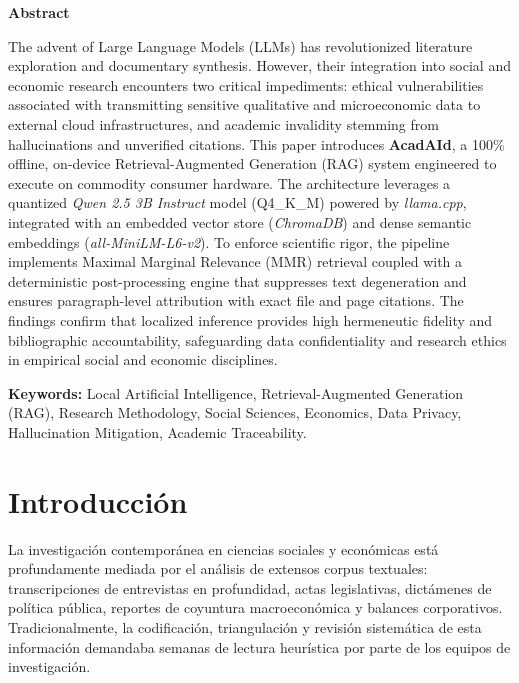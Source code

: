 \documentclass[12pt,a4paper]{article}
\begin{document}
\begin{center}
{\bfseries\large Abstract}\vspace{0.3cm}
\end{center}
\noindent The advent of Large Language Models (LLMs) has revolutionized literature exploration and documentary synthesis. However, their integration into social and economic research encounters two critical impediments: ethical vulnerabilities associated with transmitting sensitive qualitative and microeconomic data to external cloud infrastructures, and academic invalidity stemming from hallucinations and unverified citations. This paper introduces \textbf{AcadAId}, a 100\% offline, on-device Retrieval-Augmented Generation (RAG) system engineered to execute on commodity consumer hardware. The architecture leverages a quantized \textit{Qwen 2.5 3B Instruct} model (Q4\_K\_M) powered by \textit{llama.cpp}, integrated with an embedded vector store (\textit{ChromaDB}) and dense semantic embeddings (\textit{all-MiniLM-L6-v2}). To enforce scientific rigor, the pipeline implements Maximal Marginal Relevance (MMR) retrieval coupled with a deterministic post-processing engine that suppresses text degeneration and ensures paragraph-level attribution with exact file and page citations. The findings confirm that localized inference provides high hermeneutic fidelity and bibliographic accountability, safeguarding data confidentiality and research ethics in empirical social and economic disciplines.
\vspace{0.25cm}

\noindent \textbf{Keywords:} Local Artificial Intelligence, Retrieval-Augmented Generation (RAG), Research Methodology, Social Sciences, Economics, Data Privacy, Hallucination Mitigation, Academic Traceability.

\newpage

\section{Introducción}
\label{sec:intro}

La investigación contemporánea en ciencias sociales y económicas está profundamente mediada por el análisis de extensos corpus textuales: transcripciones de entrevistas en profundidad, actas legislativas, dictámenes de política pública, reportes de coyuntura macroeconómica y balances corporativos. Tradicionalmente, la codificación, triangulación y revisión sistemática de esta información demandaba semanas de lectura heurística por parte de los equipos de investigación.
\end{document}
